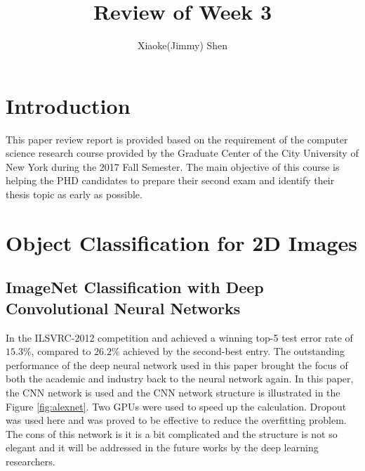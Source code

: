 \documentclass[a4paper,12pt]{article}
\begin{document}
\renewcommand\labelenumi{(\theenumi)}
\renewcommand{\vec}[1]{\mathbf{#1}}
\title {Review of Week 3 }
\author{Xiaoke(Jimmy) Shen}
\maketitle
\section{Introduction}

This paper review report is provided based on the requirement of the computer science research course provided by the Graduate Center of the City University of New York during the 2017 Fall Semester. The main objective of this course is helping the PHD candidates to prepare their second exam and identify their thesis topic as early as possible\cite{ji2017}. \\

\section{Object Classification for 2D Images}
\subsection{ImageNet Classification with Deep Convolutional Neural Networks\cite{NIPS2012_4824}}
In the ILSVRC-2012 competition and achieved a winning top-5 test error rate of $15.3\%$, compared to $26.2\%$ achieved by the second-best entry\cite{NIPS2012_4824}. The outstanding performance of the deep neural network used in this paper brought the focus of both the academic and industry back to the neural network again. In this paper, the CNN network is used and the CNN network structure is illustrated in the Figure \ref{fig:alexnet}. Two GPUs were used to speed up the calculation. Dropout \cite{DBLP:journals/corr/abs-1207-0580} was used here and was proved to be effective to reduce the overfitting problem. The cons of this network is it is a bit complicated and the structure is not so elegant and it will be addressed in the future works by the deep learning researchers.
\end{document}
